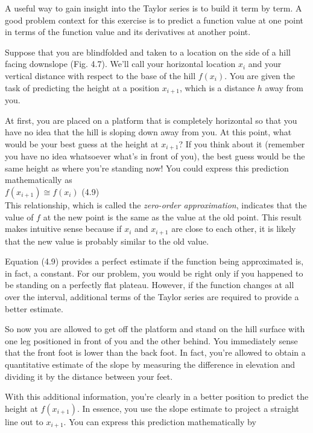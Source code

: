 \documentclass[../main.tex]{subfiles}
\begin{document}
A useful way to gain insight into the Taylor series is to build it term by term. A good
problem context for this exercise is to predict a function value at one point in terms of the
function value and its derivatives at another point.

Suppose that you are blindfolded and taken to a location on the side of a hill facing
downslope (Fig. 4.7). We'll call your horizontal location $x_i$ and your vertical distance with
respect to the base of the hill $f(x_i)$. You are given the task of predicting the height at a
position $x_{i+1}$, which is a distance $h$ away from you.

At first, you are placed on a platform that is completely horizontal so that you have no
idea that the hill is sloping down away from you. At this point, what would be your best
guess at the height at $x_{i+1}$? If you think about it (remember you have no idea whatsoever
what's in front of you), the best guess would be the same height as where you're standing
now! You could express this prediction mathematically as\\

$f(x_{i+1}) \cong f(x_i)$
\hfill
(4.9)\\

\noindent
This relationship, which is called the \emph{zero-order approximation}, indicates that the value of
$f$ at the new point is the same as the value at the old point. This result makes intuitive sense
because if $x_i$ and $x_{i+1}$ are close to each other, it is likely that the new value is probably similar
to the old value.

Equation (4.9) provides a perfect estimate if the function being approximated is, in
fact, a constant. For our problem, you would be right only if you happened to be standing
on a perfectly flat plateau. However, if the function changes at all over the interval, additional
terms of the Taylor series are required to provide a better estimate.

So now you are allowed to get off the platform and stand on the hill surface with one
leg positioned in front of you and the other behind. You immediately sense that the front
foot is lower than the back foot. In fact, you're allowed to obtain a quantitative estimate of
the slope by measuring the difference in elevation and dividing it by the distance between
your feet.

With this additional information, you're clearly in a better position to predict the
height at $f(x_{i+1})$. In essence, you use the slope estimate to project a straight line out to
$x_{i+1}$. You can express this prediction mathematically by\\
\end{document}
